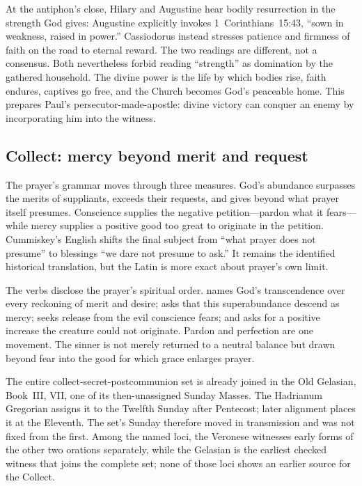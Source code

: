 At the antiphon's close, Hilary and Augustine hear bodily resurrection in the
strength God gives: Augustine explicitly invokes 1~Corinthians~15:43,
``sown in weakness, raised in power.'' Cassiodorus instead stresses patience
and firmness of faith on the road to eternal reward. The two readings are
different, not a consensus. Both nevertheless forbid reading
``strength'' as domination by the gathered household. The divine power is the
life by which bodies rise, faith endures, captives go free, and the Church
becomes God's peaceable home. This prepares Paul's persecutor-made-apostle:
divine victory can conquer an enemy by incorporating him into the witness.

\subsection*{Collect: mercy beyond merit and request\enspace{}}

The prayer's grammar moves through three measures. God's abundance surpasses
the merits of suppliants, exceeds their requests, and gives beyond what prayer
itself presumes. Conscience supplies the negative petition---pardon what it
fears---while mercy supplies a positive good too great to originate in the
petition. Cummiskey's English shifts the final subject from ``what prayer does
not presume'' to blessings ``we dare not presume to ask.'' It remains the
identified historical translation, but the Latin is more exact about prayer's
own limit.

The verbs disclose the prayer's spiritual order.  names God's
transcendence over every reckoning of merit and desire;  asks
that this superabundance descend as mercy;  seeks release from
the evil conscience fears; and  asks for a positive increase the
creature could not originate. Pardon and perfection are one movement. The
sinner is not merely returned to a neutral balance but drawn beyond fear into
the good for which grace enlarges prayer.

The entire collect-secret-postcommunion set is already joined in the Old
Gelasian, Book~III, VII, one of its then-unassigned Sunday Masses. The
Hadrianum Gregorian assigns it to the Twelfth Sunday after Pentecost; later
alignment places it at the Eleventh. The set's Sunday therefore moved in
transmission and was not fixed from the first. Among the named loci, the
Veronese witnesses early forms of the other two orations separately, while the
Gelasian is the earliest checked witness that joins the complete set; none of
those loci shows an earlier source for the Collect.

